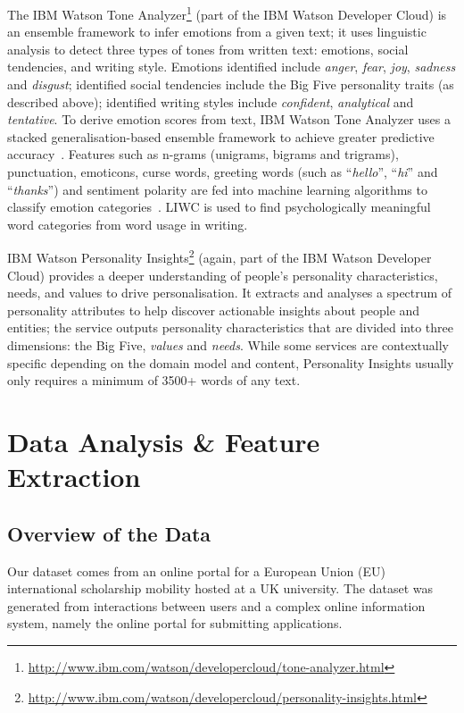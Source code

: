 \documentclass[graybox]{svmult}
\begin{document}
The IBM Watson Tone
Analyzer\footnote{\url{http://www.ibm.com/watson/developercloud/tone-analyzer.html}}
(part of the IBM Watson Developer Cloud) is an ensemble framework to
infer emotions from a given text; it uses linguistic analysis to
detect three types of tones from written text: emotions, social
tendencies, and writing style. Emotions identified include
{\emph{anger}}, {\emph{fear}}, {\emph{joy}}, {\emph{sadness}} and
{\emph{disgust}}; identified social tendencies include the Big Five
personality traits (as described above); identified writing styles
include {\emph{confident}}, {\emph{analytical}} and
{\emph{tentative}}. To derive emotion scores from text, IBM Watson Tone Analyzer uses a
stacked generalisation-based ensemble framework to achieve greater
predictive accuracy~\citep{costa+mccrae:1992}.  Features such as
n-grams (unigrams, bigrams and trigrams), punctuation, emoticons,
curse words, greeting words (such as ``{\emph{hello}}'',
``{\emph{hi}}'' and ``{\emph{thanks}}'') and sentiment polarity are
fed into machine learning algorithms to classify emotion
categories~\citep{fellbaum:2006}. LIWC is used to find psychologically
meaningful word categories from word usage in writing. 

IBM Watson Personality
Insights\footnote{\url{http://www.ibm.com/watson/developercloud/personality-insights.html}}
(again, part of the IBM Watson Developer Cloud) provides a deeper
understanding of people's personality characteristics, needs, and
values to drive personalisation. It extracts and analyses a spectrum
of personality attributes to help discover actionable insights about
people and entities; the service outputs personality characteristics
that are divided into three dimensions: the Big Five, {\emph{values}}
and {\emph{needs}}. While some services are contextually specific
depending on the domain model and content, Personality Insights
usually only requires a minimum of 3500+ words of any text.


\section{Data Analysis \& Feature Extraction}

\subsection{Overview of the Data}

Our dataset comes from an online portal for a European Union (EU)
international scholarship mobility hosted at a UK university. The
dataset was generated from interactions between users and a complex
online information system, namely the online portal for submitting
applications.
\end{document}
